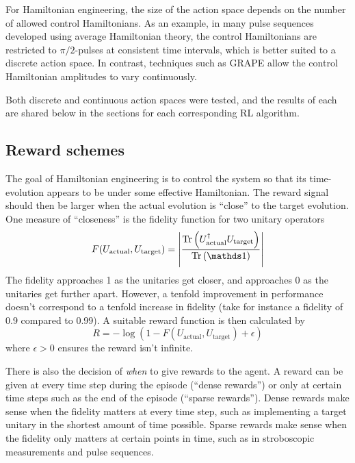 For Hamiltonian engineering, the size of the action space depends on the number of allowed control Hamiltonians. As an example, in many pulse sequences developed using average Hamiltonian theory, the control Hamiltonians are restricted to $\pi/2$-pulses at consistent time intervals, which is better suited to a discrete action space. In contrast, techniques such as GRAPE
\cite{Khaneja-2005}
allow the control Hamiltonian amplitudes to vary continuously.

Both discrete and continuous action spaces were tested, and the results of each are shared below in the sections for each corresponding RL algorithm.

\subsection{Reward schemes}

The goal of Hamiltonian engineering is to control the system so that its time-evolution appears to be under some effective Hamiltonian. The reward signal should then be larger when the actual evolution is ``close'' to the target evolution. One measure of ``closeness'' is the fidelity function for two unitary operators
\begin{equation} %
    F(U_\text{actual}, U_\text{target}) = \left| \frac{\Tr{
        U_\text{actual}^\dagger U_\text{target}
    }}{\Tr{\identity}} \right|
\end{equation}
The fidelity approaches 1 as the unitaries get closer, and approaches 0 as the unitaries get further apart. However, a tenfold improvement in performance doesn't correspond to a tenfold increase in fidelity (take for instance a fidelity of 0.9 compared to 0.99). A suitable reward function is then calculated by
\begin{equation}
    R = -\log(1-F(U_\text{actual}, U_\text{target}) + \epsilon)
\end{equation}
where $\epsilon>0$ ensures the reward isn't infinite.

There is also the decision of \emph{when} to give rewards to the agent. A reward can be given at every time step during the episode (``dense rewards'') or only at certain time steps such as the end of the episode (``sparse rewards'').
Dense rewards make sense when the fidelity matters at every time step, such as implementing a target unitary in the shortest amount of time possible.
Sparse rewards make sense when the fidelity only matters at certain points in time, such as in stroboscopic measurements and pulse sequences.

